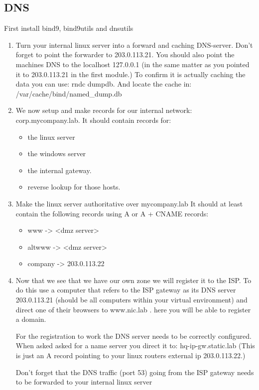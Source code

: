 \documentclass[paper=a4, fontsize=11pt]{report} %
\begin{document}
\subsection{DNS}
First install bind9, bind9utils and dnsutils
\begin{enumerate}
	\item Turn your internal linux server into a forward and caching DNS-server.  Don’t forget to point the forwarder to 203.0.113.21. You should also point the machines DNS to the localhost 127.0.0.1 (in the same matter as you pointed it to 203.0.113.21 in the first module.)
		To confirm it is actually caching the data you can use: rndc dumpdb. And locate the cache in: /var/cache/bind/named\_dump.db
	\item We now setup and make records for our internal network: corp.mycompany.lab. It  should contain records for:
		\begin{itemize}
			\item the linux server
			\item the windows server
			\item the internal gateway.
			\item reverse lookup for those hosts.
		\end{itemize}
		\item Make the linux server authoritative over mycompany.lab It should at least contain the following records using A or A + CNAME records:
			\begin{itemize}
				\item www -> <dmz server>
				\item altwww -> <dmz server>
				\item company -> 203.0.113.22
			\end{itemize}
		\item Now that we see that we have our own zone we will register it to the ISP. To do this use a computer that refers to the ISP gateway as its DNS server 203.0.113.21 (should be all computers within your virtual environment) and direct one of their browsers to www.nic.lab . here you will be able to register a domain.
			
			For the registration to work the DNS server needs to be correctly configured. When asked asked for a name server you direct it to: hq-ip-gw.static.lab (This is just an A record pointing to your linux routers external ip 203.0.113.22.)
			
			Don’t forget that the DNS traffic (port 53) going from the ISP gateway needs to be forwarded to your internal linux server
\end{enumerate}
\end{document}
